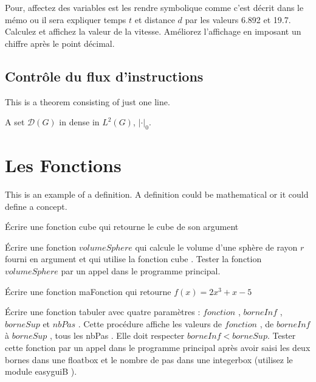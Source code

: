 \documentclass[11pt,fleqn]{book} %
\begin{document}
\begin{solution}
Pour, affectez des variables est les rendre symbolique comme c'est décrit dans le mémo ou il 
sera expliquer temps $t$ et distance $d$ par les valeurs 6.892 et 19.7. Calculez et affichez la 
valeur de la vitesse. Améliorez l’affichage en imposant un chiffre après le point décimal.
\end{solution}

\subsection{Contrôle du flux d’instructions}
This is a theorem consisting of just one line.

\begin{exercise}
A set $\mathcal{D}(G)$ in dense in $L^2(G)$, $|\cdot|_0$. 
\end{exercise}
\begin{solution}
\end{solution}

\section{Les Fonctions}

This is an example of a definition. A definition could be mathematical or it could define a concept.

\begin{exercise}
Écrire une fonction cube qui retourne le cube de son argument
\end{exercise}

\begin{exercise}
Écrire une fonction $volumeSphere$ qui calcule le volume d’une sphère de rayon $r$ fourni
en argument et qui utilise la fonction cube .
Tester la fonction $volumeSphere$ par un appel dans le programme principal.
\end{exercise}

\begin{exercise}
Écrire une fonction maFonction qui retourne $f(x) = 2x^{3} + x - 5$
\end{exercise}

\begin{exercise}
Écrire une fonction tabuler avec quatre paramètres : $fonction$ , $borneInf$ , $borneSup$
et $nbPas$ . Cette procédure affiche les valeurs de $fonction$ , de $borneInf$ à $borneSup$ ,
tous les nbPas . Elle doit respecter $borneInf < borneSup$.
Tester cette fonction par un appel dans le programme principal après avoir saisi les
deux bornes dans une floatbox et le nombre de pas dans une integerbox (utilisez le
module easyguiB ).
\end{exercise}
\end{document}
